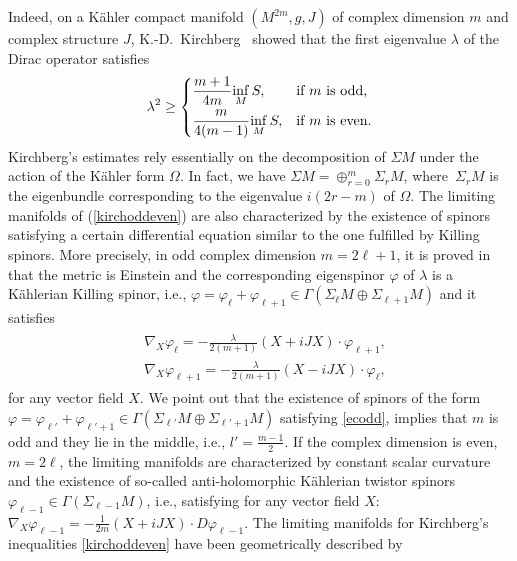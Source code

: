 \documentclass[10pt,a4paper]{amsart}
\numberwithin{equation}{section}
\theoremstyle{definition}
\begin{document}
Indeed, on a K\"ahler compact manifold $(M^{2m},g,J)$ of complex dimension $m$ and  complex structure $J$, K.-D.~Kirchberg~\cite{kirch86}  showed that the f\/irst  eigenvalue $\lambda$ of the Dirac operator satisf\/ies
\begin{gather}\label{kirchoddeven}
\lambda^2\geq\begin{cases}
\dfrac{m+1}{4m}\underset{M}{\inf}\,  S,&  \text{if $m$ is odd,} \vspace{1mm}\\
\dfrac{m}{4(m-1)}\underset{M}{\inf} \, S,&   \text{if $m$ is even.}
\end{cases}
\end{gather}
Kirchberg's estimates rely essentially on the decomposition of $\Sigma M$ under the action of the K\"ahler form $\Omega$. In fact, we have $\Sigma M = \oplus_{r=0}^m\Sigma_r M$, where~$\Sigma_r M$ is the eigenbundle corresponding to the eigenvalue $i(2r-m)$ of $\Omega$. The limiting manifolds of (\ref{kirchoddeven}) are also characterized by the existence of
spinors satisfying a certain dif\/ferential equation similar to the one fulf\/illed by Killing spinors.
More precisely, in odd complex dimension $m=2\ell+1$, it is proved in \cite{hij, kirch2,kirch} that the metric is Einstein and the corresponding eigenspinor $\varphi$ of $\lambda$ is a K\"ahlerian Killing spinor,  i.e., $\varphi=\varphi_{\ell}+\varphi_{\ell+1}\in\Gamma(\Sigma_{\ell}  M\oplus \Sigma_{\ell+1}  M)$ and
it satisf\/ies
\begin{gather}
\begin{split}
&\nabla_X \varphi_\ell = -\frac{\lambda}{2(m+1)} (X+iJX)\cdot \varphi_{\ell+1}, \\
&\nabla_X \varphi_{\ell+1} = -\frac{\lambda}{2(m+1)} (X-iJX)\cdot \varphi_{\ell},
\end{split}\label{ecodd}
\end{gather}
for any vector f\/ield $X$.  We point out that the existence of spinors of the form $\varphi=\varphi_{\ell'}+\varphi_{\ell'+1}\in\Gamma(\Sigma_{\ell'}M\oplus\Sigma_{\ell'+1}M)$
satisfying \eqref{ecodd}, implies that $m$ is odd and they lie in the middle,  i.e., $l' =\frac{m-1}{2}$. If the complex dimension is even, $m=2\ell$, the limiting manifolds are characterized by constant scalar curvature and the existence of so-called anti-holomorphic K\"ahlerian twistor spinors $\varphi_{\ell-1}\in\Gamma(\Sigma_{\ell-1}M)$, i.e., satisfying for any vector f\/ield $X$: $\nabla_X \varphi_{\ell-1}= -\frac{1}{2m}(X+iJX)\cdot D\varphi_{\ell-1}$.
The limiting manifolds for Kirchberg's inequalities \eqref{kirchoddeven} have been geometrically described by
\end{document}
